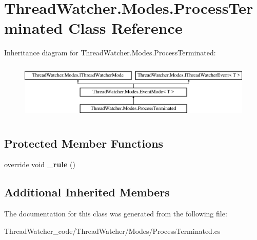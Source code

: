 \hypertarget{class_thread_watcher_1_1_modes_1_1_process_terminated}{\section{Thread\+Watcher.\+Modes.\+Process\+Terminated Class Reference}
\label{class_thread_watcher_1_1_modes_1_1_process_terminated}
}
Inheritance diagram for Thread\+Watcher.\+Modes.\+Process\+Terminated\+:\begin{figure}[H]
\begin{center}
\leavevmode
\includegraphics[height=2.745098cm]{class_thread_watcher_1_1_modes_1_1_process_terminated}
\end{center}
\end{figure}
\subsection*{Protected Member Functions}
\begin{DoxyCompactItemize}
\item 
\hypertarget{class_thread_watcher_1_1_modes_1_1_process_terminated_a6e2f79997a20d0f031869cdddf7bb52d}{override void {\bfseries \+\_\+rule} ()}\label{class_thread_watcher_1_1_modes_1_1_process_terminated_a6e2f79997a20d0f031869cdddf7bb52d}

\end{DoxyCompactItemize}
\subsection*{Additional Inherited Members}


The documentation for this class was generated from the following file\+:\begin{DoxyCompactItemize}
\item 
Thread\+Watcher\+\_\+code/\+Thread\+Watcher/\+Modes/Process\+Terminated.\+cs\end{DoxyCompactItemize}
